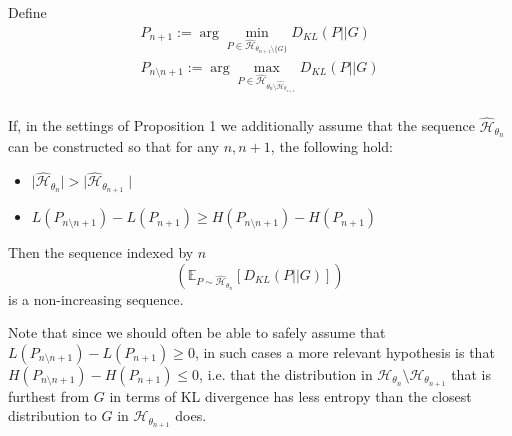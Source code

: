 \documentclass[12pt]{article}
\newenvironment{corollary}[2][Corollary]{\begin{trivlist}
\item[\hskip \labelsep {\bfseries #1}\hskip \labelsep {\bfseries #2.}]}{\end{trivlist}}
\begin{document}
\begin{corollary}{1}
    Define 
    \begin{gather*}
        P_{n+1}:=\arg \min_{P\in \hat{\mathcal{H}}_{\theta_{n+1}\setminus \{G\}}} D_{KL}(P||G) \\
        P_{n\setminus n+1} := \arg \max_{P\in \hat{\mathcal{H}}_{\theta_{n}\setminus \hat{\mathcal{H}}_{\theta_{n+1}}}} D_{KL}(P||G) \\
    \end{gather*}
    
    If, in the settings of Proposition 1 we additionally assume that the sequence $\hat{\mathcal{H}}_{\theta_n}$ can be constructed so that for any $n,n+1$, the following hold:
    \begin{itemize}
        \item $\mid \hat{\mathcal{H}}_{\theta_n} \mid > \mid \hat{\mathcal{H}}_{\theta_{n+1}}\mid$
        \item $L(P_{n\setminus n+1}) - L(P_{n+1}) \geq H(P_{n\setminus n+1}) - H(P_{n+1})$
    \end{itemize}
    Then the sequence indexed by $n$
    \begin{equation*}
        (\mathds{E}_{P\sim \hat{\mathcal{H}}_{\theta_n}}[D_{KL}(P || G)])
    \end{equation*}
    is a non-increasing sequence. %

    \bigskip

    Note that since we should often be able to safely assume that $L(P_{n\setminus n+1}) - L(P_{n+1}) \geq 0$, in such cases a more relevant hypothesis is that $H(P_{n\setminus n+1}) - H(P_{n+1}) \leq 0$, i.e. that the distribution in $\mathcal{H}_{\theta_n}\setminus\mathcal{H}_{\theta_{n+1}}$ that is furthest from $G$ in terms of KL divergence has less entropy than the closest distribution to $G$ in $\mathcal{H}_{\theta_{n+1}}$ does. 
\end{corollary}
\end{document}
